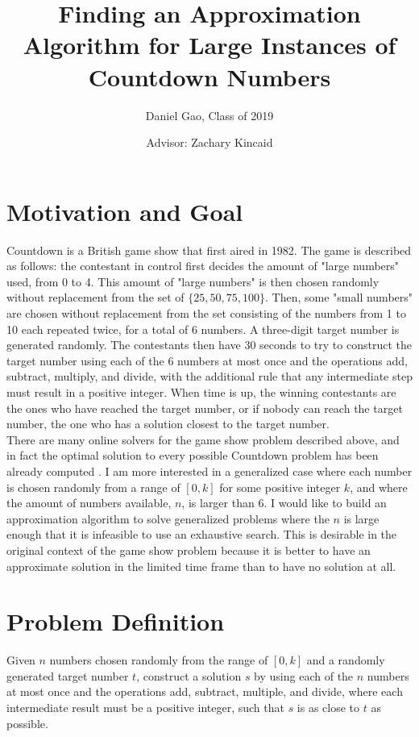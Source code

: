 \documentclass[12pt]{article}
\begin{document}
\title{Finding an Approximation Algorithm for Large Instances of Countdown Numbers} %
\author{Daniel Gao, Class of 2019} %
\date{Advisor: Zachary Kincaid}
\maketitle

\section*{Motivation and Goal}
Countdown is a British game show that first aired in 1982. The game is described as follows: the contestant in control first decides the amount of "large numbers" used, from 0 to 4. This amount of "large numbers" is then chosen randomly without replacement from the set of $\{25, 50, 75, 100\}$. Then, some "small numbers" are chosen without replacement from the set consisting of the numbers from 1 to 10 each repeated twice, for a total of 6 numbers. A three-digit target number is generated randomly. The contestants then have 30 seconds to try to construct the target number using each of the 6 numbers at most once and the operations add, subtract, multiply, and divide, with the additional rule that any intermediate step must result in a positive integer. When time is up, the winning contestants are the ones who have reached the target number, or if nobody can reach the target number, the one who has a solution closest to the target number.  \\
There are many online solvers for the game show problem described above, and in fact the optimal solution to every possible Countdown problem has been already computed \cite{S. Colton}. I am more interested in a generalized case where each number is chosen randomly from a range of $[0, k]$ for some positive integer $k$, and where the amount of numbers available, $n$, is larger than $6$. I would like to build an approximation algorithm to solve generalized problems where the $n$ is large enough that it is infeasible to use an exhaustive search. This is desirable in the original context of the game show problem because it is better to have an approximate solution in the limited time frame than to have no solution at all.
\section*{Problem Definition}
Given $n$ numbers chosen randomly from the range of $[0, k]$ and a randomly generated target number $t$, construct a solution $s$ by using each of the $n$ numbers at most once and the operations add, subtract, multiple, and divide, where each intermediate result must be a positive integer, such that $s$ is as close to $t$ as possible. 
\end{document}
